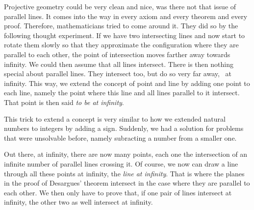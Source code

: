 \documentclass[tikz]{scrreprt}
\begin{document}
\begin{center}
\end{center}

Projective geometry could be very clean and nice, was there not
that issue of parallel lines. It comes into the way in every
axiom and every theorem and every proof. Therefore, mathematicians
tried to come around it. 
They did so by the following thought experiment.
If we have two intersecting lines and now start to
rotate them slowly so that they approximate the configuration
where they are parallel to each other,
the point of intersection moves farther away towards
infinity. We could then assume that all lines intersect.
There is then nothing special about parallel lines.
They intersect too, but do so very far away, \viz\
at infinity. This way, we extend the concept
of point and line by adding one point to each line,
namely the point where this line and 
all lines parallel to it
intersect. That point is then said \emph{to
be at infinity}.

This trick to extend a concept is very similar 
to how we extended natural numbers to
integers by adding a sign. Suddenly, we had a solution
for problems that were unsolvable before,
namely subracting a number from a smaller one.

Out there, at infinity, there are now many points,
each one the intersection of an infinite number 
of parallel lines crossing it. Of course, we now
can draw a line through all these points at infinity,
the \emph{line at infinity}. That is where the planes 
in the proof of Desargues' theorem intersect in
the case where they are parallel to each other.
We then only have to prove that, if one pair of
lines intersect at infinity, the other two as well
intersect at infinity.
\end{document}
